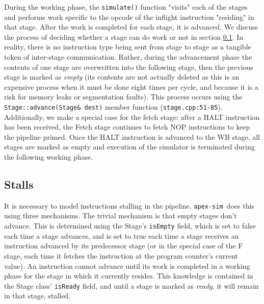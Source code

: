 \documentclass[12pt]{article}
\newcommand{\codename}[0]{\texttt{apex-sim}~}
\begin{document}
During the working phase, the \texttt{simulate()} function "visits" each of the stages and performs work specific to the opcode of the inflight instruction "residing" in that stage.
After the work is completed for each stage, it is advanced.
We discuss the process of deciding whether a stage can do work or not in section \ref{sec:stalls}.
In reality, there is no instruction type being sent from stage to stage as a tangible token of inter-stage communication.
Rather, during the advancement phase the contents of one stage are overwritten into the following stage, then the previous stage is marked as \textit{empty} (its contents are not actually deleted as this is an expensive process when it must be done eight times per cycle, and because it is a risk for memory leaks or segmentation faults).
This process occurs using the \texttt{Stage::advance(Stage\& dest)} member function (\texttt{stage.cpp:51-85}).
Additionally, we make a special case for the fetch stage: after a HALT instruction has been received, the Fetch stage continues to fetch NOP instructions to keep the pipeline primed.
Once the HALT instruction is advanced to the WB stage, all stages are marked as empty and execution of the simulator is terminated during the following working phase.

\subsection{Stalls}
\label{sec:stalls}
It is necessary to model instructions stalling in the pipeline.
\codename does this using three mechanisms.
The trivial mechanism is that empty stages don't advance.
This is determined using the Stage's \texttt{isEmpty} field, which is set to false each time a stage advances, and is set to true each time a stage receives an instruction advanced by its predecessor stage (or in the special case of the F stage, each time it fetches the instruction at the program counter's current value).
An instruction cannot advance until its work is completed in a working phase for the stage in which it currently resides.
This knowledge is contained in the Stage class' \texttt{isReady} field, and until a stage is marked as \textit{ready}, it will remain in that stage, stalled.
\end{document}
